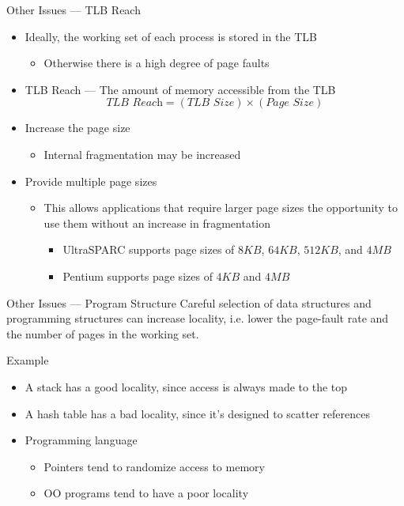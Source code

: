 \begin{frame}{Other Issues --- TLB Reach}
  \begin{itemize}
  \item Ideally, the working set of each process is stored in the TLB
    \begin{itemize}
    \item Otherwise there is a high degree of page faults
    \end{itemize}
  \item \alert{TLB Reach} --- The amount of memory accessible from the TLB
    $$\textit{TLB Reach} = (\textit{TLB Size}) \times (\textit{Page Size})$$
  \item Increase the page size
    \begin{itemize}
    \item[] Internal fragmentation may be increased
    \end{itemize}
  \item Provide multiple page sizes
    \begin{itemize}
    \item This allows applications that require larger page sizes the opportunity to use
      them without an increase in fragmentation
      \begin{itemize}
      \item UltraSPARC supports page sizes of $8KB$, $64KB$, $512KB$, and $4MB$
      \item Pentium supports page sizes of $4KB$ and $4MB$
      \end{itemize}
    \end{itemize}
  \end{itemize}
\end{frame}

\begin{frame}{Other Issues --- Program Structure}
  Careful selection of data structures and programming structures can increase locality,
  i.e. lower the page-fault rate and the number of pages in the working set.
  \begin{block}{Example}
    \begin{itemize}
    \item A stack has a good locality, since access is always made to the top
    \item A hash table has a bad locality, since it's designed to scatter references
    \item Programming language
      \begin{itemize}
      \item Pointers tend to randomize access to memory
      \item OO programs tend to have a poor locality
      \end{itemize}
    \end{itemize}
  \end{block}
\end{frame}

